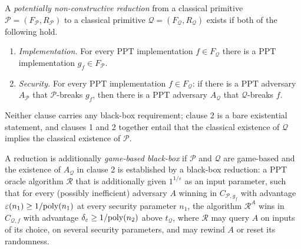 \documentclass{aicr-conjecture}
\newcommand{\Pc}{\mathcal{P}}
\newcommand{\Qc}{\mathcal{Q}}
\newcommand{\Rc}{\mathcal{R}}
\newcommand{\PPT}{\mathrm{PPT}}
\begin{document}
\begin{definition}\label{def:red}
A \emph{potentially non-constructive reduction} from a classical
primitive $\Pc = (F_{\Pc}, R_{\Pc})$ to a classical primitive
$\Qc = (F_{\Qc}, R_{\Qc})$ exists if both of the following hold.
\begin{enumerate}
\item \emph{Implementation.} For every $\PPT$ implementation
  $f \in F_{\Qc}$ there is a $\PPT$ implementation $g_f \in F_{\Pc}$.
\item \emph{Security.} For every $\PPT$ implementation $f \in F_{\Qc}$:
  if there is a $\PPT$ adversary $A_{\Pc}$ that $\Pc$-breaks $g_f$, then
  there is a $\PPT$ adversary $A_{\Qc}$ that $\Qc$-breaks $f$.
\end{enumerate}
Neither clause carries any black-box requirement; clause 2 is a bare
existential statement, and clauses 1 and 2 together entail that the
classical existence of $\Qc$ implies the classical existence of $\Pc$.

A reduction is additionally \emph{game-based black-box} if $\Pc$ and
$\Qc$ are game-based and the existence of $A_{\Qc}$ in clause 2 is
established by a black-box reduction: a $\PPT$ oracle algorithm $\Rc$
that is additionally given $1^{1/\varepsilon}$ as an input parameter,
such that for every (possibly inefficient) adversary $A$ winning in
$C_{\Pc,g_f}$ with advantage
$\varepsilon(n_1) \ge 1/\mathrm{poly}(n_1)$ at every security parameter $n_1$,
the algorithm $\Rc^{A}$ wins in $C_{\Qc,f}$ with advantage
$\delta_{\varepsilon} \ge 1/\mathrm{poly}(n_2)$ above $t_{\Qc}$, where $\Rc$ may
query $A$ on inputs of its choice, on several security parameters, and
may rewind $A$ or reset its randomness.
\end{definition}
\end{document}
